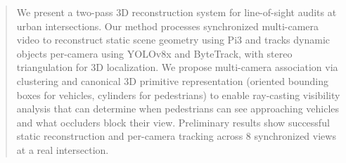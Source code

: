 \begin{abstract}
We present a two-pass 3D reconstruction system for line-of-sight audits at urban intersections. Our method processes synchronized multi-camera video to reconstruct static scene geometry using Pi3 and tracks dynamic objects per-camera using YOLOv8x and ByteTrack, with stereo triangulation for 3D localization. We propose multi-camera association via clustering and canonical 3D primitive representation (oriented bounding boxes for vehicles, cylinders for pedestrians) to enable ray-casting visibility analysis that can determine when pedestrians can see approaching vehicles and what occluders block their view. Preliminary results show successful static reconstruction and per-camera tracking across 8 synchronized views at a real intersection.
\end{abstract}